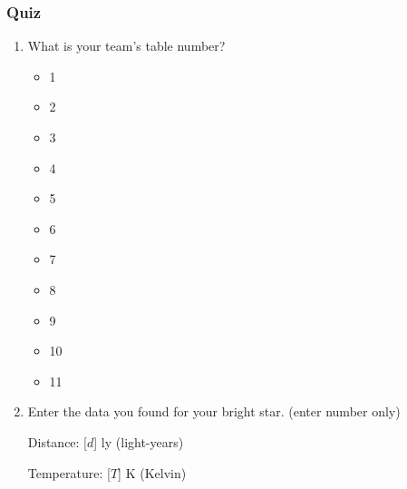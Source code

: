 \documentclass[12pt]{article}
\begin{document}
\subsubsection{Quiz}
\begin{enumerate}
\item
What is your team's table number?
\begin{itemize}
    \item 1
    \item 2
    \item 3
    \item 4
    \item 5
    \item 6
    \item 7
    \item 8
    \item 9
    \item 10
    \item 11
\end{itemize}
\item
Enter the data you found for your bright star. (enter number only)

Distance: [$d$] ly (light-years)

Temperature: [$T$] K (Kelvin)


\end{enumerate}
\end{document}
